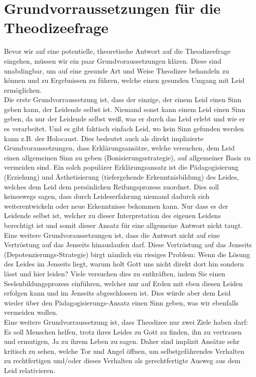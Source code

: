 \section{Grundvorraussetzungen für die Theodizeefrage}
Bevor wir auf eine potentielle, theoretische Antwort auf die Theodizeefrage eingehen, müssen wir ein paar Grundvoraussetzungen klären. Diese sind unabdingbar, um auf eine gesunde Art und Weise Theodizee behandeln zu können und zu Ergebnissen zu führen, welche einen gesunden Umgang mit Leid ermöglichen.\\

Die erste Grundvorraussetzung ist, dass der einzige, der einem Leid einen Sinn geben kann, der Leidende selbst ist. Niemand sonst kann einem Leid einen Sinn geben, da nur der Leidende selbst weiß, was er durch das Leid erlebt und wie er es verarbeitet. Und es gibt faktisch einfach Leid, wo kein Sinn gefunden werden kann z.B. der Holocaust. Dies bedeutet auch als direkt implizierte Grundvoraussetzungen, dass Erklärungsansätze, welche versuchen, dem Leid einen allgemeinen Sinn zu geben (Bonisierungsstrategie), auf allgemeiner Basis zu vermeiden sind. Ein solch populärer Erklärungsansatz ist die Pädagogisierung (Erziehung) und Ästhetisierung (tiefergehende Erkenntnisbildung) des Leides, welches dem Leid dem persönlichen Reifungsprozess zuordnet. Dies soll keineswegs sagen, dass durch Leideserfahrung niemand dadurch sich weiterentwickeln oder neue Erkenntnisse bekommen kann. Nur dass es der Leidende selbst ist, welcher zu dieser Interpretation des eigenen Leidens berechtigt ist und somit dieser Ansatz für eine allgemeine Antwort nicht taugt.\\

Eine weitere Grundvoraussetzungen ist, dass die Antwort nicht auf eine Vertröstung auf das Jenseits hinauslaufen darf. Diese Vertröstung auf das Jenseits (Depotenzierungs-Strategie) birgt nämlich ein riesiges Problem: Wenn die Lösung des Leides im Jenseits liegt, warum holt Gott uns nicht direkt dort hin sondern lässt und hier leiden? Viele versuchen dies zu entkräften, indem Sie einen Seelenbildungsprozess einführen, welcher nur auf Erden mit eben diesen Leiden erfolgen kann und im Jenseits abgeschlossen ist. Dies würde aber dem Leid wieder über den Pädagogisierungs-Ansatz einen Sinn geben, was wir ebenfalls vermeiden wollen. \\

Eine weitere Grundvorraussetzung ist, dass Theodizee nur zwei Ziele haben darf: Es soll Menschen helfen, trotz ihres Leides zu Gott zu finden, ihn zu vertrauen und ermutigen, \glqq Ja\grqq{} zu ihrem Leben zu sagen. Daher sind implizit Ansätze sehr kritisch zu sehen, welche Tor und Angel öffnen, um selbstgefährendes Verhalten zu rechtfertigen und/oder dieses Verhalten als gerechtfertigte Ausweg aus dem Leid relativieren.\\

